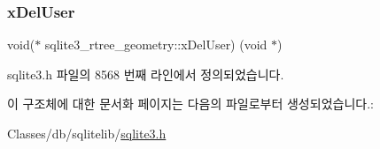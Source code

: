 \subsubsection{\texorpdfstring{x\+Del\+User}{xDelUser}}
{\footnotesize\ttfamily void($\ast$ sqlite3\+\_\+rtree\+\_\+geometry\+::x\+Del\+User) (void $\ast$)}



sqlite3.\+h 파일의 8568 번째 라인에서 정의되었습니다.



이 구조체에 대한 문서화 페이지는 다음의 파일로부터 생성되었습니다.\+:\begin{DoxyCompactItemize}
\item 
Classes/db/sqlitelib/\hyperlink{sqlite3_8h}{sqlite3.\+h}\end{DoxyCompactItemize}
